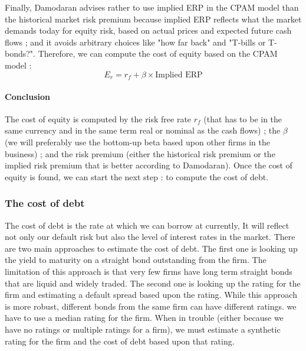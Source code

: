 Finally, Damodaran advises rather to use implied ERP in the CPAM model than the historical market risk premium because implied ERP reflects what the market demands today for equity risk, based on actual prices and expected future cash flows ; and it avoids arbitrary choices like "how far back" and "T-bills or T-bonds?". Therefore, we can compute the cost of equity based on the CPAM model : 
\begin{equation}
    E_r = r_f + \beta\times \text{Implied ERP}
\end{equation}

\paragraph{Conclusion}

The cost of equity is computed by the risk free rate $r_f$ (that has to be in the same currency and in the same term real or nominal as the cash flows) ; the $\beta$ (we will preferably use the bottom-up beta based upon other firms in the business) ; and the risk premium (either the historical risk premium or the implied risk premium that is better according to Damodaran). Once the cost of equity is found, we can start the next step : to compute the cost of debt. 

\subsubsection{The cost of debt}

The cost of debt is the rate at which we can borrow at currently, It will reflect not only our default risk but also the level of interest rates in the market. There are two main approaches to estimate the cost of debt. The first one is looking up the yield to maturity on a straight bond outstanding from the firm. The limitation of this approach is that very few firms have long term straight bonds that are liquid and widely traded. The second one is looking up the rating for the firm and estimating a default spread based upon the rating. While this approach is more robust, different bonds from the same firm can have different ratings. we have to use a median rating for the firm. When in trouble (either because we  have no ratings or multiple ratings for a firm), we must estimate a synthetic rating for the firm and the cost of
debt based upon that rating.








